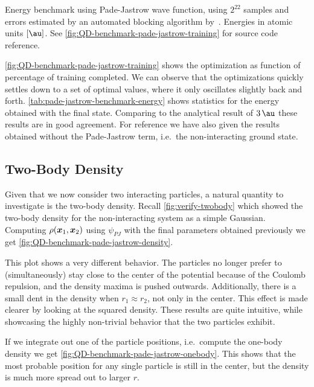 \documentclass[Thesis.tex]{subfiles}
\begin{document}
\begin{table}[h]
  \centering
  \caption[Energy estimates of Pade-Jastrow wave function]{Energy benchmark using Pade-Jastrow wave function, using $2^{22}$
    samples and errors estimated by an automated blocking algorithm
    by~\textcite{Jonsson-2018}. Energies in atomic units $[\si{\au}]$. See \cref{fig:QD-benchmark-pade-jastrow-training}
    for source code reference.}
  
  \label{tab:pade-jastrow-benchmark-energy}
\end{table}

\cref{fig:QD-benchmark-pade-jastrow-training} shows the optimization as function
of percentage of training completed. We can observe that the optimizations
quickly settles down to a set of optimal values, where it only oscillates
slightly back and forth. \cref{tab:pade-jastrow-benchmark-energy} shows
statistics for the energy obtained with the final state. Comparing to the
analytical result of $\SI{3}{\au}$ these results are in good agreement. For
reference we have also given the results obtained without the Pade-Jastrow term,
i.e.\ the non-interacting ground state.

\subsection{Two-Body Density}

Given that we now consider two interacting particles, a natural quantity to
investigate is the two-body density. Recall \cref{fig:verify-twobody} which
showed the two-body density for the non-interacting system as a simple Gaussian.
Computing $\rho(\bm{x}_1, \bm{x}_2)$ using $\psi_{PJ}$ with the final parameters
obtained previously we get \cref{fig:QD-benchmark-pade-jastrow-density}.

This plot shows a very different behavior. The particles no longer prefer to
(simultaneously) stay close to the center of the potential because of the Coulomb repulsion, and
the density maxima is pushed outwards. Additionally, there is a small dent in
the density when $r_1\approx r_2$, not only in the center. This effect is made
clearer by looking at the squared density. These results are quite intuitive,
while showcasing the highly non-trivial behavior that the two particles exhibit.

If we integrate out one of the particle positions, i.e.\ compute the one-body
density we get \cref{fig:QD-benchmark-pade-jastrow-onebody}. This shows that the
most probable position for any single particle is still in the center, but the
density is much more spread out to larger $r$.
\end{document}
